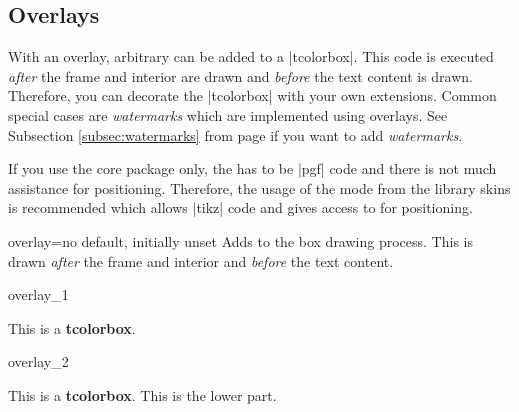 \clearpage
\subsection{Overlays}\label{subsec:overlays}
With an overlay, arbitrary  can be added to a
|tcolorbox|. This code is executed \emph{after} the frame and interior are
drawn and \emph{before} the text content is drawn. Therefore, you can
decorate the |tcolorbox| with your own extensions.
Common special cases are \emph{watermarks} which are implemented using overlays.
See Subsection \ref{subsec:watermarks} from page \pageref{subsec:watermarks} if
you want to add \emph{watermarks}.
\begin{marker}
If you use the core package only, the  has to be |pgf| code
and there is not much assistance for positioning.
Therefore, the usage of the  mode from the library skins
is recommended which allows |tikz| code and gives access to
 for positioning.
\end{marker}

\begin{docTcbKey}{overlay}{=}{no default, initially unset}
  Adds  to the box drawing process. This 
  is drawn \emph{after} the frame and interior and \emph{before} the text content.

\begin{exdispExample}{overlay_1}

\begin{tcolorbox}[frogbox,title=My title]
This is a \textbf{tcolorbox}.
\end{tcolorbox}
\end{exdispExample}

\enlargethispage*{5mm}
\begin{exdispExample}{overlay_2}

\begin{tcolorbox}[ribbonbox,title=My title]
This is a \textbf{tcolorbox}.
\tcblower
This is the lower part.
\end{tcolorbox}
\end{exdispExample}
\end{docTcbKey}

